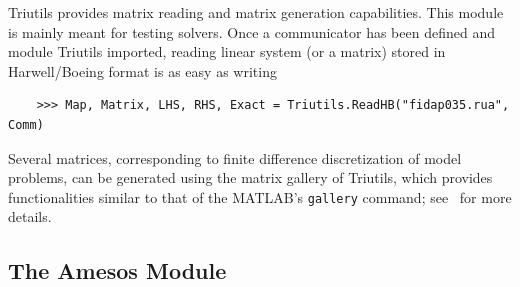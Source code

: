 \documentclass[10pt,relax]{SANDreport}
\begin{document}
Triutils provides matrix reading and matrix generation capabilities. This
module is mainly meant for testing solvers. Once a communicator has been
defined and module Triutils imported, reading linear system (or a matrix)
stored in Harwell/Boeing format is as easy as writing
\begin{verbatim}
    >>> Map, Matrix, LHS, RHS, Exact = Triutils.ReadHB("fidap035.rua", Comm)
\end{verbatim}
Several matrices, corresponding to finite difference discretization of model
problems, can be generated using the matrix gallery of Triutils, which
provides functionalities similar to that of the MATLAB's {\tt gallery}
command; see~\cite[Chapter 5]{Trilinos-tutorial} for more details.

\subsection{The Amesos Module}
\label{subsec:amesos}
\end{document}
